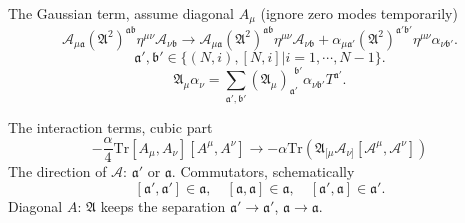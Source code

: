 The Gaussian term, assume diagonal $A_\mu$
(ignore zero modes temporarily)
\[
	\mathcal{A}_{\mu \mathfrak{a}} 
	( \mathfrak{A}^2)^{\mathfrak{a}\mathfrak{b}} 
	\eta^{\mu\nu} \mathcal{A}_{\nu \mathfrak{b}}
	\to
	\mathcal{A}_{\mu \mathfrak{a}} 
	( \mathfrak{A}^2)^{\mathfrak{a}\mathfrak{b}} 
	\eta^{\mu\nu} \mathcal{A}_{\nu \mathfrak{b}}
	+ \alpha_{\mu \mathfrak{a}'}
	(\mathfrak{A}^2)^{\mathfrak{a}'\mathfrak{b}'}
	\eta^{\mu\nu} \alpha_{\nu \mathfrak{b}'}
.\] 
\[
	\mathfrak{a}',\mathfrak{b}' \in \{(N,i),[N,i] \vert i=1,\cdots,N-1\}
.\] 
\[
	\mathfrak{A}_\mu \alpha_\nu = \sum_{\mathfrak{a}',\mathfrak{b}'}
	(\mathfrak{A}_\mu)_{\mathfrak{a}'}^{~~\mathfrak{b}'}
	\alpha_{\nu \mathfrak{b}'} T^{\mathfrak{a}'}
.\] 

The interaction terms, cubic part
\begin{equation}
	- \frac{\alpha}{4} \mathrm{Tr}[A_\mu,A_\nu][A^\mu,A^\nu]
	\to
	- \alpha \mathrm{Tr} \left( 
	\mathfrak{A}_{[\mu} \mathcal{A}_{\nu]}
	[\mathcal{A}^\mu,\mathcal{A}^\nu]\right) 
\end{equation}
The direction of $\mathcal{A}$: $\mathfrak{a}'$ or $\mathfrak{a}$.
Commutators, schematically
\[
	[\mathfrak{a}',\mathfrak{a}'] \in \mathfrak{a},\quad
	[\mathfrak{a},\mathfrak{a}]\in \mathfrak{a},\quad
	[\mathfrak{a}',\mathfrak{a}]\in \mathfrak{a}'
.\] 
Diagonal $A$: $\mathfrak{A}$ keeps the separation 
$\mathfrak{a}'\to \mathfrak{a}'$, $\mathfrak{a}\to \mathfrak{a}$.

